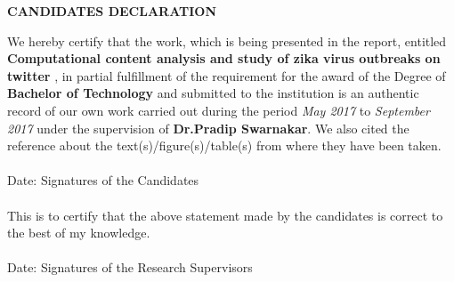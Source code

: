 \newpage
\begin{center}
{\large \bf CANDIDATES DECLARATION}
\end{center}
We hereby certify that the work, which is being presented in the report, entitled {\bf Computational content analysis and study of zika virus outbreaks on twitter }, in partial fulfillment of the requirement for the award of the
Degree of {\bf Bachelor of Technology} and submitted to the institution is an authentic record of our own work carried out
during the period \emph{May 2017} to \emph{September 2017} under the supervision of {\bf Dr.Pradip Swarnakar}.
We also cited the reference about the text(s)/figure(s)/table(s) from where they have been taken.\\
\vspace{0.6in} \\
Date: \hspace{3.0in} Signatures of the Candidates \\
\vspace{0.2in} \\
This is to certify that the above statement made by the candidates is correct to the best of my knowledge. \\
\vspace{0.5in} \\
Date: \hspace{2.45in} Signatures of the Research Supervisors \\



